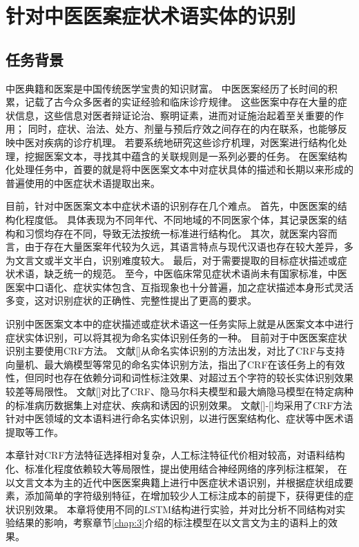 \chapter{针对中医医案症状术语实体的识别}
\section{任务背景}
中医典籍和医案是中国传统医学宝贵的知识财富。
中医医案经历了长时间的积累，记载了古今众多医者的实证经验和临床诊疗规律。
这些医案中存在大量的症状信息，这些信息对医者辩证论治、察明证素，进而对证施治起着至关重要的作用；
同时，症状、治法、处方、剂量与预后疗效之间存在的内在联系，也能够反映中医对疾病的诊疗机理。
若要系统地研究这些诊疗机理，对医案进行结构化处理，挖掘医案文本，寻找其中蕴含的关联规则是一系列必要的任务。
在医案结构化处理任务中，首要的就是将中医医案文本中对症状具体的描述和长期以来形成的普遍使用的中医症状术语提取出来。

目前，针对中医医案文本中症状术语的识别存在几个难点。
首先，中医医案的结构化程度低。
具体表现为不同年代、不同地域的不同医家个体，其记录医案的结构和习惯均存在不同，导致无法按统一标准进行结构化。
其次，就医案内容而言，由于存在大量医案年代较为久远，其语言特点与现代汉语也存在较大差异，多为文言文或半文半白，识别难度较大。
最后，对于需要提取的目标症状描述或症状术语，缺乏统一的规范。
至今，中医临床常见症状术语尚未有国家标准，中医医案中口语化、症状实体包含、互指现象也十分普遍，加之症状描述本身形式灵活多变，这对识别症状的正确性、完整性提出了更高的要求。

识别中医医案文本中的症状描述或症状术语这一任务实际上就是从医案文本中进行症状实体识别，可以将其视为命名实体识别任务的一种。
目前对于中医医案症状识别主要使用CRF方法。
文献[]从命名实体识别的方法出发，对比了CRF与支持向量机、最大熵模型等常见的命名实体识别方法，指出了CRF在该任务上的有效性，但同时也存在依赖分词和词性标注效果、对超过五个字符的较长实体识别效果较差等局限性。
文献[]对比了CRF、隐马尔科夫模型和最大熵隐马模型在特定病种的标准病历数据集上对症状、疾病和诱因的识别效果。
文献[]-[]均采用了CRF方法针对中医领域的文本语料进行命名实体识别，以进行医案结构化、症状等中医术语提取等工作。

本章针对CRF方法特征选择相对复杂，人工标注特征代价相对较高，对语料结构化、标准化程度依赖较大等局限性，提出使用结合神经网络的序列标注框架，
在以文言文本为主的近代中医医案典籍上进行中医症状术语识别，并根据症状组成要素，添加简单的字符级别特征，在增加较少人工标注成本的前提下，获得更佳的症状识别效果。
本章将使用不同的LSTM结构进行实验，并对比分析不同结构对实验结果的影响，考察章节\ref{chap:3}介绍的标注模型在以文言文为主的语料上的效果。

